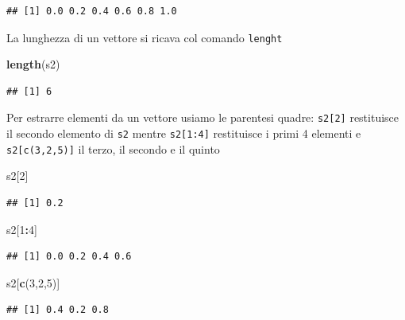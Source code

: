 \documentclass[
  11pt,
]{book}
\newenvironment{Shaded}{\begin{snugshade}}{\end{snugshade}}
\newcommand{\DecValTok}[1]{\textcolor[rgb]{0.00,0.00,0.81}{#1}}
\newcommand{\FunctionTok}[1]{\textcolor[rgb]{0.13,0.29,0.53}{\textbf{#1}}}
\newcommand{\NormalTok}[1]{#1}
\newcommand{\SpecialCharTok}[1]{\textcolor[rgb]{0.81,0.36,0.00}{\textbf{#1}}}
\theoremstyle{mytheoremstyle}
\theoremstyle{mydefstyle}
\begin{document}
\begin{verbatim}
## [1] 0.0 0.2 0.4 0.6 0.8 1.0
\end{verbatim}

La lunghezza di un vettore si ricava col comando \texttt{lenght}

\begin{Shaded}
\begin{Highlighting}[]
\FunctionTok{length}\NormalTok{(s2)}
\end{Highlighting}
\end{Shaded}

\begin{verbatim}
## [1] 6
\end{verbatim}

Per estrarre elementi da un vettore usiamo le parentesi quadre: \texttt{s2{[}2{]}} restituisce il secondo elemento di \texttt{s2} mentre \texttt{s2{[}1:4{]}} restituisce i primi 4 elementi e \texttt{s2{[}c(3,2,5){]}}
il terzo, il secondo e il quinto

\begin{Shaded}
\begin{Highlighting}[]
\NormalTok{s2[}\DecValTok{2}\NormalTok{]}
\end{Highlighting}
\end{Shaded}

\begin{verbatim}
## [1] 0.2
\end{verbatim}

\begin{Shaded}
\begin{Highlighting}[]
\NormalTok{s2[}\DecValTok{1}\SpecialCharTok{:}\DecValTok{4}\NormalTok{]}
\end{Highlighting}
\end{Shaded}

\begin{verbatim}
## [1] 0.0 0.2 0.4 0.6
\end{verbatim}

\begin{Shaded}
\begin{Highlighting}[]
\NormalTok{s2[}\FunctionTok{c}\NormalTok{(}\DecValTok{3}\NormalTok{,}\DecValTok{2}\NormalTok{,}\DecValTok{5}\NormalTok{)]}
\end{Highlighting}
\end{Shaded}

\begin{verbatim}
## [1] 0.4 0.2 0.8
\end{verbatim}
\end{document}
